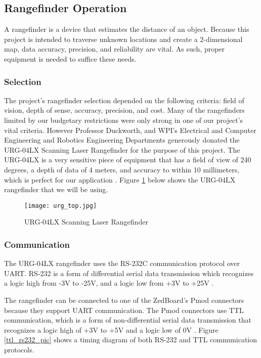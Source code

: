 \subsection{Rangefinder Operation}
A rangefinder is a device that estimates the distance of an object. Because this project is intended to traverse unknown locations and create a 2-dimensional map, data accuracy, precision, and reliability are vital. As such, proper equipment is needed to suffice these needs. 

\subsubsection{Selection}
The project's rangefinder selection depended on the following criteria: field of vision, depth of sense, accuracy, precision, and cost. Many of the rangefinders limited by our budgetary restrictions were only strong in one of our project's vital criteria. However Professor Duckworth, and WPI's Electrical and Computer Engineering and Robotics Engineering Departments generously donated the URG-04LX Scanning Laser Rangefinder for the purpose of this project. The URG-04LX is a very sensitive piece of equipment that has a field of view of 240 degrees, a depth of data of 4 meters, and accuracy to within 10 millimeters, which is perfect for our application \cite{urg04lx_specifications}. Figure \ref{rangefinder_pic} below shows the URG-04LX rangefinder that we will be using.

\begin{figure}[H]
	\centerline{\texttt{[image: urg\_top.jpg]}}
	\caption{URG-04LX Scanning Laser Rangefinder}
	\label{rangefinder_pic}
\end{figure}

\subsubsection{Communication}
The URG-04LX rangefinder uses the RS-232C communication protocol over UART. RS-232 is a form of differential serial data transmission which recognizes a logic high from -3V to -25V, and a logic low from +3V to +25V \cite{rs232}.
\par
The rangefinder can be connected to one of the ZedBoard's Pmod connectors because they support UART communication. The Pmod connectors use TTL communication, which is a form of non-differential serial data transmission that recognizes a logic high of +3V to +5V and a logic low of 0V \cite{ttl}. Figure \ref{ttl_rs232_pic} shows a timing diagram of both RS-232 and TTL communication protocols.

